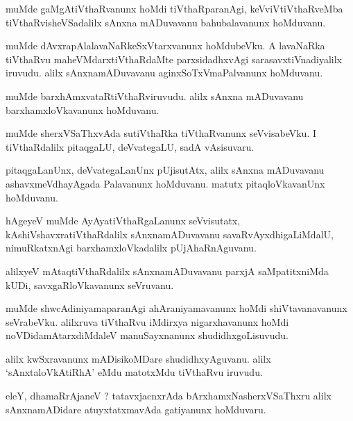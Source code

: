 \documentclass{article}
\begin{document}
\begin{mn}
muMde gaMgAtiVthaRvanunx  hoMdi tiVthaRparanAgi, keVviVtiVthaRveMba tiVthaRvisheVSadalilx sAnxna 
mADuvavanu bahubalavanunx hoMduvanu.
\end{mn}

\begin{mn}
muMde dAvxrapAlalavaNaRkeSxVtarxvanunx hoMdubeVku. A lavaNaRka tiVthaRvu maheVMdarxtiVthaRdaMte
parxsidadhxvAgi sarasavxtiVnadiyalilx iruvudu. alilx sAnxnamADuvavanu aginxSoTxVmaPalvanunx 
hoMduvanu.
\end{mn}

\begin{mn}
muMde barxhAmxvataRtiVthaRviruvudu. alilx sAnxna mADuvavanu barxhamxloVkavanunx hoMduvanu.
\end{mn}

\begin{mn}
muMde sherxVSaThxvAda sutiVthaRka tiVthaRvanunx seVvisabeVku. I tiVthaRdalilx pitaqgaLU, 
deVvategaLU, sadA vAsisuvaru.
\end{mn}

\begin{mn}
pitaqgaLanUnx, deVvategaLanUnx pUjisutAtx, alilx sAnxna mADuvavanu ashavxmeVdhayAgada Palavanunx 
hoMduvanu. matutx pitaqloVkavanUnx hoMduvanu.
\end{mn}

\begin{mn}
hAgeyeV muMde AyAyatiVthaRgaLanunx seVvisutatx, kAshiVshavxratiVthaRdalilx sAnxnamADuvavanu 
savaRvAyxdhigaLiMdalU, nimuRkatxnAgi barxhamxloVkadalilx pUjAhaRnAguvanu.
\end{mn}

\begin{mn}
alilxyeV mAtaqtiVthaRdalilx sAnxnamADuvavanu parxjA saMpatitxniMda kUDi, savxgaRloVkavanunx 
seVruvanu.
\end{mn}

\begin{mn}
muMde shwcAdiniyamaparanAgi ahAraniyamavanunx hoMdi shiVtavanavanunx seVrabeVku. alilxruva 
tiVthaRvu iMdirxya nigarxhavanunx hoMdi noVDidamAtarxdiMdaleV manuSayxnanunx shudidhxgoLisuvudu.
\end{mn}

\begin{mn}
alilx kwSxravanunx mADisikoMDare shudidhxyAguvanu. alilx `sAnxtaloVkAtiRhA' eMdu matotxMdu tiVthaRvu
iruvudu.
\end{mn}

\begin{mn}
eleY, dhamaRrAjaneV ? tatavxjacnxrAda bArxhamxNasherxVSaThxru alilx sAnxnamADidare atuyxtatxmavAda 
gatiyanunx hoMduvaru.
\end{mn}
\end{document}
